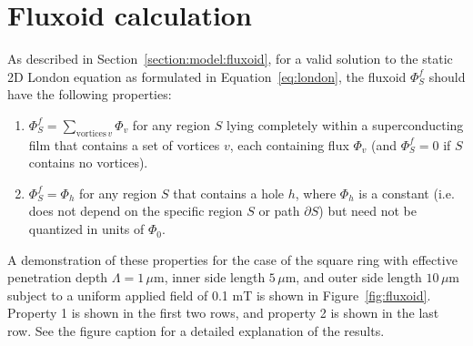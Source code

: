 \documentclass[final,3p,times]{elsarticle}
\begin{document}
\section{Fluxoid calculation}
\label{appendix:fluxoid}
As described in Section~\ref{section:model:fluxoid}, for a valid solution to the static 2D London equation as formulated in Equation~\ref{eq:london}, the fluxoid $\Phi^f_S$ should have the following properties:
\begin{enumerate}
    \item{$\Phi^f_S = \sum_{\mathrm{vortices}\,v}\Phi_v$ for any region $S$ lying completely within a superconducting film that contains a set of vortices $v$, each containing flux $\Phi_v$ (and $\Phi^f_S = 0$ if $S$ contains no vortices).}
    \item{$\Phi^f_S = \Phi_h$ for any region $S$ that contains a hole $h$, where $\Phi_h$ is a constant (i.e. does not depend on the specific region $S$ or path $\partial S$) but need not be quantized in units of $\Phi_0$.}
\end{enumerate}

A demonstration of these properties for the case of the square ring with effective penetration depth $\Lambda=1\,\mu\mathrm{m}$, inner side length $5\,\mu\mathrm{m}$, and outer side length $10\,\mu\mathrm{m}$ subject to a uniform applied field of 0.1 mT is shown in Figure~\ref{fig:fluxoid}. Property 1 is shown in the first two rows, and property 2 is shown in the last row. See the figure caption for a detailed explanation of the results.
\end{document}
